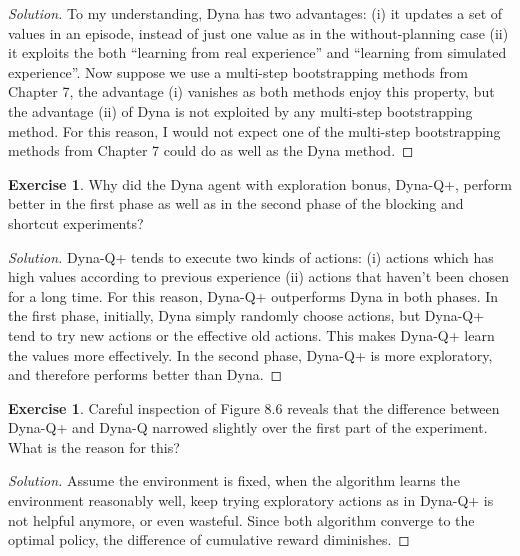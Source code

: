 \documentclass[oneside,11pt]{article}
\theoremstyle{definition}
\newtheorem{exer}[thm]{Exercise}
\newenvironment{solution}
{\renewcommand\qedsymbol{$\blacksquare$}\begin{proof}[Solution]} {\end{proof}}
\begin{document}
\begin{shaded}
\begin{solution} 
To my understanding, Dyna has two advantages: (i) it updates a set of values in an episode, instead of just one value as in the without-planning case (ii) it exploits the both ``learning from real experience'' and ``learning from simulated experience''. Now suppose we use a multi-step bootstrapping methods from Chapter 7, the advantage (i) vanishes as both methods enjoy this property, but the advantage (ii) of Dyna is not exploited by any multi-step bootstrapping method. For this reason, I would not expect one of the multi-step bootstrapping methods from Chapter 7 could do as well as the Dyna method. 

\end{solution} 
\end{shaded}


\begin{exer}
Why did the Dyna agent with exploration bonus, Dyna-Q+, perform better in the first phase as well as in the second phase of the blocking and shortcut experiments?
\end{exer}


\begin{shaded}
\begin{solution} 
Dyna-Q+ tends to execute two kinds of actions: (i) actions which has high values according to previous experience (ii) actions that haven't been chosen for a long time. For this reason,  Dyna-Q+ outperforms Dyna in both phases. In the first phase, initially, Dyna simply randomly choose actions, but Dyna-Q+ tend to try new actions or the effective old actions. This makes Dyna-Q+ learn the values more effectively. In the second phase, Dyna-Q+ is more exploratory, and therefore performs better than Dyna.


\end{solution} 
\end{shaded}



\begin{exer}
Careful inspection of Figure 8.6 reveals that the difference between Dyna-Q+ and Dyna-Q narrowed slightly over the first part of the experiment. What is the reason for this?
\end{exer}


\begin{shaded}
\begin{solution} 
Assume the environment is fixed, when the algorithm learns the environment reasonably well, keep trying exploratory actions as in Dyna-Q+ is not helpful anymore, or even wasteful. Since both algorithm converge to the optimal policy, the difference of cumulative reward diminishes.
\end{solution} 
\end{shaded}
\end{document}
